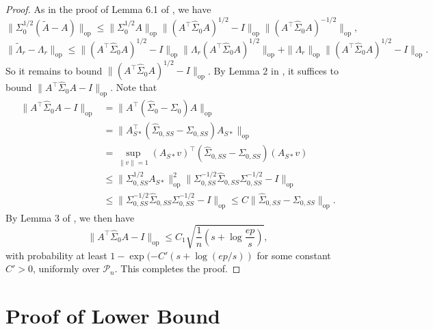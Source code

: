 \documentclass[11pt]{article}
\newcommand{\nb}[1]{\textcolor{orange}{\texttt{[#1]}}}
\newcommand{\gsc}[1]{\textcolor{blue}{\texttt{[#1]}}}
\newcommand{\so}{\widehat{\Sigma}_0}
\newcommand{\0}{{\mathbf{0}}}
\newcommand{\op}{{\mathrm{op}}}
\newcommand{\tA}{{\widetilde{A}}}
\newcommand{\tlambda}{{\widetilde{\Lambda}_r}}
\begin{document}
\begin{proof}
As in the proof of Lemma 6.1 of \cite{gao2017sparse}, we have\begin{equation*}
     \|\Sigma_0^{1/2}(\tA-A)\|_{\text{op}}\leq \|\Sigma_0^{1/2} A\|_{\op}\|(A^\top  \widehat{\Sigma}_0A)^{1/2}-I\|_{\op}\|(A^\top  \widehat{\Sigma}_0A)^{-1/2}\|_{\op},
\end{equation*}
\begin{equation*}
    \|\tlambda-\Lambda_r\|_{\op}\leq \|(A^\top  \widehat{\Sigma}_0A)^{1/2}-I\|_{\op}\|\Lambda_r(A^\top  \widehat{\Sigma}_0A)^{1/2}\|_{\op}+\|\Lambda_r\|_{\op}\|(A^\top  \widehat{\Sigma}_0A)^{1/2}-I\|_{\op}.
\end{equation*}
So it remains to bound $\|(A^\top  \so A)^{1/2}-I\|_{\op}$. 
By Lemma 2 in \cite{gao2015minimax}, it suffices to bound $\|A^\top  \widehat{\Sigma}_0A-I\|_{\op}$. 
Note that 
\begin{align*}
    \|A^\top  \widehat{\Sigma}_0A-I\|_{\op} &= \|A^\top  (\widehat{\Sigma}_0-\Sigma_0)A\|_\op\\
    &=\|A_{S*}^\top  (\widehat{\Sigma}_{0,SS}-\Sigma_{0,SS})A_{S*}\|_{\op}\\
    &= \sup_{\|v\|=1}(A_{S*}v)^\top  (\widehat{\Sigma}_{0,SS}-\Sigma_{0,SS})(A_{S*}v)\\
    &\leq \|\Sigma_{0,SS}^{1/2}A_{S*}\|_{\op}^2\| \Sigma_{0,SS}^{-1/2} \widehat{\Sigma}_{0,SS} \Sigma_{0,SS}^{-1/2}-I\|_{\op}\\
    &\leq \| \Sigma_{0,SS}^{-1/2} \widehat{\Sigma}_{0,SS} \Sigma_{0,SS}^{-1/2}-I\|_{\op}\leq C\| \widehat{\Sigma}_{0,SS}-\Sigma_{0,SS}\|_{\op}.
\end{align*}
By Lemma 3 of \cite{gao2015minimax}, we then have \begin{equation*}
    \|A^\top  \widehat{\Sigma}_0A-I\|_{\op}\leq C_1\sqrt{\frac{1}{n}\left(s+\log\frac{ep}{s}\right)},
\end{equation*}
with probability at least $1-\exp(-C'(s+\log (ep/s))$ { for some constant $C'>0$, uniformly over $\mathcal{P}_n$}.
This completes the proof.
\end{proof}


\section{Proof of Lower Bound}
\label{sec:proof_lower_bound}
\end{document}
